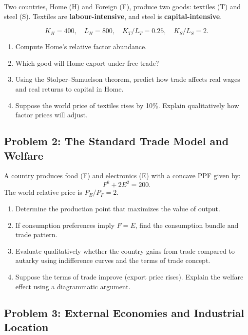 \documentclass[12pt]{article}
\begin{document}
Two countries, Home (H) and Foreign (F), produce two goods: textiles (T) and steel (S).  
Textiles are \textbf{labour-intensive}, and steel is \textbf{capital-intensive}.  

\[
K_H = 400, \quad L_H = 800, \quad K_T/L_T = 0.25, \quad K_S/L_S = 2.
\]

\begin{enumerate}[label=(\alph*)]
\item Compute Home’s relative factor abundance.  
\item Which good will Home export under free trade?  
\item Using the Stolper–Samuelson theorem, predict how trade affects real wages and real returns to capital in Home.  
\item Suppose the world price of textiles rises by 10\%. Explain qualitatively how factor prices will adjust.  
\end{enumerate}

\vspace{1em}

\subsection*{Problem 2: The Standard Trade Model and Welfare }

A country produces food (F) and electronics (E) with a concave PPF given by:
\[
F^2 + 2E^2 = 200.
\]
The world relative price is \( P_E/P_F = 2 \).

\begin{enumerate}[label=(\alph*)]
\item Determine the production point that maximizes the value of output.  
\item If consumption preferences imply \( F = E \), find the consumption bundle and trade pattern.  
\item Evaluate qualitatively whether the country gains from trade compared to autarky using indifference curves and the terms of trade concept.  
\item Suppose the terms of trade improve (export price rises). Explain the welfare effect using a diagrammatic argument.  
\end{enumerate}

\vspace{1em}

\subsection*{Problem 3: External Economies and Industrial Location}
\end{document}

